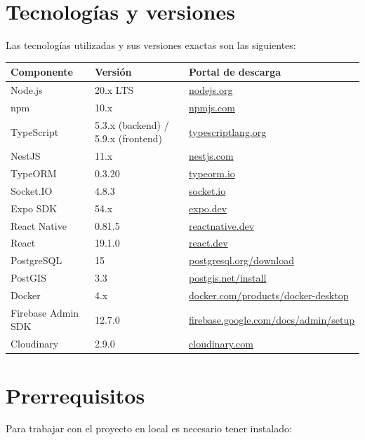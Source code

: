 \section{Tecnologías y versiones}

Las tecnologías utilizadas y sus versiones exactas son las siguientes:

\begin{longtable}{|l|l|l|}
\hline
\textbf{Componente} & \textbf{Versión} & \textbf{Portal de descarga} \\
\hline
Node.js & 20.x LTS & \href{https://nodejs.org}{nodejs.org} \\
npm & 10.x & \href{https://www.npmjs.com}{npmjs.com} \\
TypeScript & 5.3.x (backend) / 5.9.x (frontend) & \href{https://www.typescriptlang.org}{typescriptlang.org} \\
NestJS & 11.x & \href{https://nestjs.com}{nestjs.com} \\
TypeORM & 0.3.20 & \href{https://typeorm.io}{typeorm.io} \\
Socket.IO & 4.8.3 & \href{https://socket.io}{socket.io} \\
Expo SDK & 54.x & \href{https://expo.dev}{expo.dev} \\
React Native & 0.81.5 & \href{https://reactnative.dev}{reactnative.dev} \\
React & 19.1.0 & \href{https://react.dev}{react.dev} \\
PostgreSQL & 15 & \href{https://www.postgresql.org/download}{postgresql.org/download} \\
PostGIS & 3.3 & \href{https://postgis.net/install}{postgis.net/install} \\
Docker & 4.x & \href{https://www.docker.com/products/docker-desktop}{docker.com/products/docker-desktop} \\
Firebase Admin SDK & 12.7.0 & \href{https://firebase.google.com/docs/admin/setup}{firebase.google.com/docs/admin/setup} \\
Cloudinary & 2.9.0 & \href{https://cloudinary.com}{cloudinary.com} \\
\hline
\end{longtable}

\section{Prerrequisitos}

Para trabajar con el proyecto en local es necesario tener instalado:

